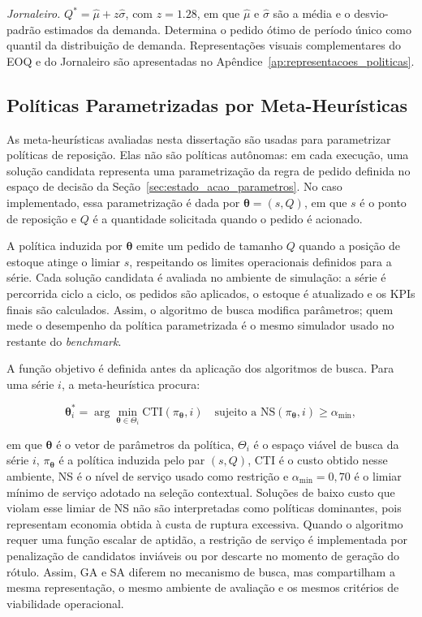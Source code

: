 \textit{Jornaleiro.} $Q^* = \hat{\mu} + z\hat{\sigma}$, com $z = 1.28$, em que $\hat{\mu}$ e $\hat{\sigma}$ são a média e o desvio-padrão estimados da demanda. Determina o pedido ótimo de período único como quantil da distribuição de demanda. Representações visuais complementares do EOQ e do Jornaleiro são apresentadas no Apêndice~\ref{ap:representacoes_politicas}.

\subsection{Políticas Parametrizadas por Meta-Heurísticas}

As meta-heurísticas avaliadas nesta dissertação são usadas para parametrizar políticas de reposição. Elas não são políticas autônomas: em cada execução, uma solução candidata representa uma parametrização da regra de pedido definida no espaço de decisão da Seção~\ref{sec:estado_acao_parametros}. No caso implementado, essa parametrização é dada por $\boldsymbol{\theta}=(s,Q)$, em que $s$ é o ponto de reposição e $Q$ é a quantidade solicitada quando o pedido é acionado.

A política induzida por $\boldsymbol{\theta}$ emite um pedido de tamanho $Q$ quando a posição de estoque atinge o limiar $s$, respeitando os limites operacionais definidos para a série. Cada solução candidata é avaliada no ambiente de simulação: a série é percorrida ciclo a ciclo, os pedidos são aplicados, o estoque é atualizado e os KPIs finais são calculados. Assim, o algoritmo de busca modifica parâmetros; quem mede o desempenho da política parametrizada é o mesmo simulador usado no restante do \textit{benchmark}.

A função objetivo é definida antes da aplicação dos algoritmos de busca. Para uma série $i$, a meta-heurística procura:

\begin{equation}
  \boldsymbol{\theta}_i^*
  = \arg\min_{\boldsymbol{\theta} \in \Theta_i}
  \mathrm{CTI}(\pi_{\boldsymbol{\theta}}, i)
  \quad \text{sujeito a } \mathrm{NS}(\pi_{\boldsymbol{\theta}}, i) \geq \alpha_{\min},
  \label{eq:obj_metaheuristicas}
\end{equation}

\noindent em que $\boldsymbol{\theta}$ é o vetor de parâmetros da política, $\Theta_i$ é o espaço viável de busca da série $i$, $\pi_{\boldsymbol{\theta}}$ é a política induzida pelo par $(s,Q)$, CTI é o custo obtido nesse ambiente, NS é o nível de serviço usado como restrição e $\alpha_{\min}=0{,}70$ é o limiar mínimo de serviço adotado na seleção contextual. Soluções de baixo custo que violam esse limiar de NS não são interpretadas como políticas dominantes, pois representam economia obtida à custa de ruptura excessiva. Quando o algoritmo requer uma função escalar de aptidão, a restrição de serviço é implementada por penalização de candidatos inviáveis ou por descarte no momento de geração do rótulo. Assim, GA e SA diferem no mecanismo de busca, mas compartilham a mesma representação, o mesmo ambiente de avaliação e os mesmos critérios de viabilidade operacional.

